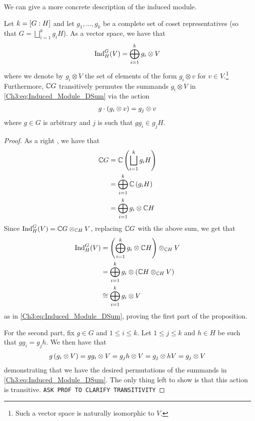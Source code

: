 We can give a more concrete description of the induced module.

\begin{proposition}
    Let $k = \left[ G : H \right]$ and let $g_1, \ldots, g_k$ be a complete set of coset representatives (so that $G = \bigsqcup_{i=1}^{k} g_i H$). As a vector space, we have that
    \begin{align}
        \operatorname{Ind}_H^G(V) = \bigoplus_{i=1}^{k} g_i \otimes V
        \label{Ch3:eq:Induced_Module_DSum}
    \end{align}
    where we denote by $g_i \otimes V$ the set of elements of the form $g_i \otimes v$ for $v \in V$.\footnote{Such a vector space is naturally isomorphic to $V$.} Furthermore, $\mathbb{C} G$ transitively permutes the summands $g_i \otimes V$ in \eqref{Ch3:eq:Induced_Module_DSum} via the action
    \begin{align*}
        g \cdot \left( g_i \otimes v \right) = g_j \otimes v
    \end{align*}
    where $g \in G$ is arbitrary and $j$ is such that $g g_i \in g_j H$.
\end{proposition}
\begin{proof}
    As a right \CHM, we have that
    \begin{align*}
        \mathbb{C} G &= \mathbb{C} \left( \bigsqcup_{i=1}^{k} g_i H \right) \\
        &= \bigoplus_{i=1}^{k} \mathbb{C} \left( g_i H \right) \\
        &= \bigoplus_{i=1}^{k} g_i \otimes \mathbb{C} H
    \end{align*}
    Since $\operatorname{Ind}_H^G(V) = \mathbb{C} G \otimes_{\mathbb{C} H} V$, replacing $\mathbb{C} G$ with the above sum, we get that
    \begin{align*}
        \operatorname{Ind}_H^G(V) &= \left( \bigoplus_{i=1}^{k} g_i \otimes \mathbb{C} H \right) \otimes_{\mathbb{C} H} V \\
        &= \bigoplus_{i=1}^{k} g_i \otimes \left( \mathbb{C} H \otimes_{\mathbb{C} H} V \right) \\
        &\cong \bigoplus_{i=1}^{k} g_i \otimes V
    \end{align*}
    as in \eqref{Ch3:eq:Induced_Module_DSum}, proving the first part of the proposition.

    For the second part, fix $g \in G$ and $1 \leq i \leq k$. Let $1 \leq j \leq k$ and $h \in H$ be such that $g g_i = g_j h$. We then have that
    \begin{align*}
        g\left( g_i \otimes V \right) = g g_i \otimes V = g_j h \otimes V = g_j \otimes h V = g_j \otimes V
    \end{align*}
    demonstrating that we have the desired permutations of the summands in \eqref{Ch3:eq:Induced_Module_DSum}. The only thing left to show is that this action is transitive. \verb|ASK PROF TO CLARIFY TRANSITIVITY|
\end{proof}


